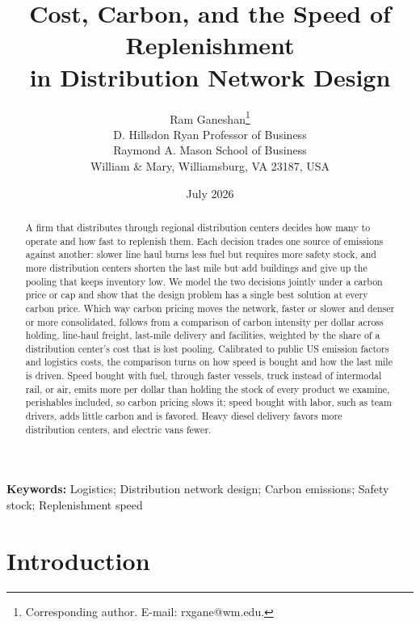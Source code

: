 \documentclass[11pt]{article}
\title{Cost, Carbon, and the Speed of Replenishment\\ in Distribution Network Design}
\author{Ram Ganeshan\thanks{Corresponding author. E-mail: rxgane@wm.edu.} \\
\small D. Hillsdon Ryan Professor of Business \\
\small Raymond A. Mason School of Business \\
\small William \& Mary, Williamsburg, VA 23187, USA}
\date{July 2026}
\theoremstyle{definition}
\theoremstyle{remark}
\theoremstyle{plain}
\begin{document}
\maketitle

\begin{abstract}
\noindent A firm that distributes through regional distribution centers decides how many to operate and how
fast to replenish them. Each decision trades one source of emissions against another: slower line haul burns
less fuel but requires more safety stock, and more distribution centers shorten the last mile but add buildings
and give up the pooling that keeps inventory low. We model the two decisions jointly under a carbon price or cap
and show that the design problem has a single best solution at every carbon price. Which way carbon pricing
moves the network, faster or slower and denser or more consolidated, follows from a comparison of carbon
intensity per dollar across holding, line-haul freight, last-mile delivery and facilities, weighted by the share
of a distribution center's cost that is lost pooling. Calibrated to public US emission factors and logistics
costs, the comparison turns on how speed is bought and how the last mile is driven. Speed bought with fuel,
through faster vessels, truck instead of intermodal rail, or air, emits more per dollar than holding the stock of
every product we examine, perishables included, so carbon pricing slows it; speed bought with labor, such as team
drivers, adds little carbon and is favored. Heavy diesel delivery favors more distribution centers, and electric
vans fewer.
\end{abstract}

\vspace{1em}
\noindent\textbf{Keywords:} Logistics; Distribution network design; Carbon emissions; Safety stock; Replenishment speed

\newpage

\section{Introduction}\label{sec:intro}
\end{document}
